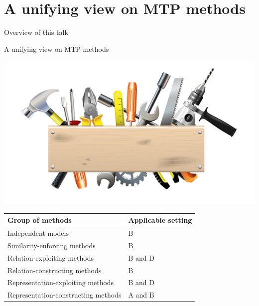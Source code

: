 \documentclass[]{beamer}
\begin{document}
\section{A unifying view on MTP methods}


\begin{frame}{Overview of this talk}

\tableofcontents

\end{frame}

\begin{frame}{A unifying view on MTP methods}

\begin{center}
\includegraphics[scale=0.3]{pics/tools}

\begin{tabular}{ll}
\hline
Group of methods & Applicable setting \\
\hline
\hline
Independent models & B \\
Similarity-enforcing methods & B   \\ 
Relation-exploiting methods & B and D  \\
Relation-constructing methods & B \\
Representation-exploiting methods & B and D \\
Representation-constructing methods & A and B \\
\hline  
\end{tabular}
\end{center}
\end{frame}

\end{document}

